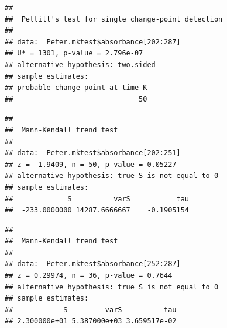 \documentclass[12pt,]{article}
\newenvironment{Shaded}{\begin{snugshade}}{\end{snugshade}}
\newcommand{\KeywordTok}[1]{\textcolor[rgb]{0.13,0.29,0.53}{\textbf{#1}}}
\newcommand{\DecValTok}[1]{\textcolor[rgb]{0.00,0.00,0.81}{#1}}
\newcommand{\CommentTok}[1]{\textcolor[rgb]{0.56,0.35,0.01}{\textit{#1}}}
\newcommand{\OperatorTok}[1]{\textcolor[rgb]{0.81,0.36,0.00}{\textbf{#1}}}
\newcommand{\NormalTok}[1]{#1}
\begin{document}
\begin{Shaded}
\end{Shaded}

\begin{verbatim}
## 
##  Pettitt's test for single change-point detection
## 
## data:  Peter.mktest$absorbance[202:287]
## U* = 1301, p-value = 2.796e-07
## alternative hypothesis: two.sided
## sample estimates:
## probable change point at time K 
##                              50
\end{verbatim}

\begin{Shaded}
\end{Shaded}

\begin{verbatim}
## 
##  Mann-Kendall trend test
## 
## data:  Peter.mktest$absorbance[202:251]
## z = -1.9409, n = 50, p-value = 0.05227
## alternative hypothesis: true S is not equal to 0
## sample estimates:
##             S          varS           tau 
##  -233.0000000 14287.6666667    -0.1905154
\end{verbatim}

\begin{Shaded}
\end{Shaded}

\begin{verbatim}
## 
##  Mann-Kendall trend test
## 
## data:  Peter.mktest$absorbance[252:287]
## z = 0.29974, n = 36, p-value = 0.7644
## alternative hypothesis: true S is not equal to 0
## sample estimates:
##            S         varS          tau 
## 2.300000e+01 5.387000e+03 3.659517e-02
\end{verbatim}
\end{document}

